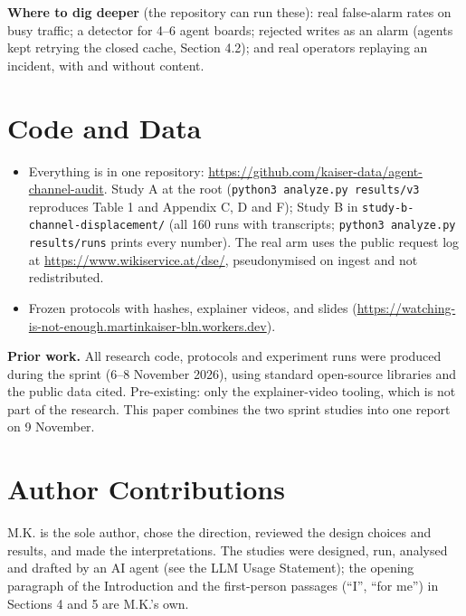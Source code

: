 \documentclass[10pt]{article}
\begin{document}
\textbf{Where to dig deeper} (the repository can run these): real false-alarm rates on busy traffic; a detector for 4--6 agent boards; rejected writes as an alarm (agents kept retrying the closed cache, Section 4.2); and real operators replaying an incident, with and without content.

\section*{Code and Data}
\begin{itemize}
\item Everything is in one repository: \url{https://github.com/kaiser-data/agent-channel-audit}. Study A at the root (\texttt{python3 analyze.py results/v3} reproduces Table 1 and Appendix C, D and F); Study B in \texttt{study-b-channel-displacement/} (all 160 runs with transcripts; \texttt{python3 analyze.py results/runs} prints every number). The real arm uses the public request log at \url{https://www.wikiservice.at/dse/}, pseudonymised on ingest and not redistributed.
\item Frozen protocols with hashes, explainer videos, and slides (\url{https://watching-is-not-enough.martinkaiser-bln.workers.dev}).
\end{itemize}

\textbf{Prior work.} All research code, protocols and experiment runs were produced during the sprint (6--8 November 2026), using standard open-source libraries and the public data cited. Pre-existing: only the explainer-video tooling, which is not part of the research. This paper combines the two sprint studies into one report on 9 November.

\section*{Author Contributions}
M.K. is the sole author, chose the direction, reviewed the design choices and results, and made the interpretations. The studies were designed, run, analysed and drafted by an AI agent (see the LLM Usage Statement); the opening paragraph of the Introduction and the first-person passages (``I'', ``for me'') in Sections 4 and 5 are M.K.'s own.
\end{document}
